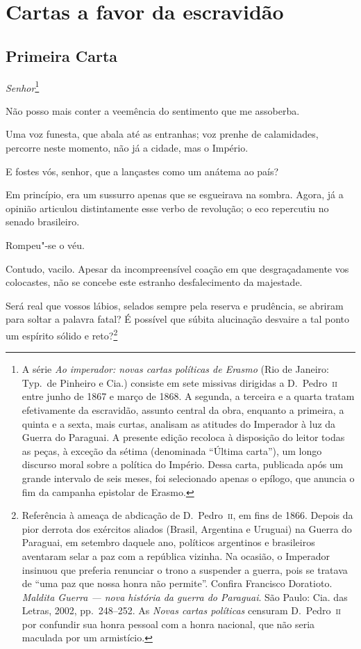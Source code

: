 \part{Cartas a favor da escravidão}

\chapter{Primeira Carta}

\noindent\textit{Senhor}\footnote{ A série \textit{Ao imperador: novas cartas políticas de Erasmo}
(Rio de Janeiro: Typ.~de Pinheiro e Cia.) consiste em sete missivas
dirigidas a D.~Pedro~\textsc{ii} entre junho de 1867 e março de 1868. A segunda,
a terceira e a quarta tratam efetivamente da escravidão, assunto
central da obra, enquanto a primeira, a quinta e a sexta, mais curtas,
analisam as atitudes do Imperador à luz da Guerra do Paraguai. A
presente edição recoloca à disposição do leitor todas as peças, à
exceção da sétima (denominada ``Última carta''), um longo discurso moral sobre a política
do Império. Dessa carta, publicada após um grande intervalo de seis
meses, foi selecionado apenas o epílogo, que anuncia o fim da
campanha epistolar de Erasmo.}\smallskip

Não posso mais conter a veemência do sentimento que me assoberba. 

Uma voz funesta, que abala até as entranhas; voz prenhe de calamidades,
percorre neste momento, não já a cidade, mas o Império. 

E fostes vós, senhor, que a lançastes como um anátema ao país? 

Em princípio, era um sussurro apenas que se esgueirava na sombra.
Agora, já a opinião articulou distintamente esse verbo de revolução; o
eco repercutiu no senado brasileiro. 

 Rompeu"-se o véu. 

 Contudo, vacilo. Apesar da incompreensível coação em que
desgraçadamente vos colocastes, não se concebe este estranho
desfalecimento da majestade. 

 Será real que vossos lábios, selados sempre pela reserva e prudência,
se abriram para soltar a palavra fatal? É possível que súbita
alucinação desvaire a tal ponto um espírito sólido e
reto?\footnote{ Referência à ameaça de abdicação de D.~Pedro~\textsc{ii}, em fins de 1866. Depois da pior
derrota dos exércitos aliados (Brasil, Argentina e Uruguai) na Guerra
do Paraguai, em setembro daquele ano, políticos argentinos e
brasileiros aventaram selar a paz com a república vizinha. Na ocasião,
o Imperador insinuou que preferia renunciar o trono a suspender a
guerra, pois se tratava de ``uma paz que nossa honra não permite''.
Confira Francisco Doratioto. \textit{Maldita Guerra --- nova história da
guerra do Paraguai}. São Paulo: Cia. das Letras, 2002, pp.~248--252.
As \textit{Novas cartas políticas} censuram D.~Pedro~\textsc{ii} por confundir
sua honra pessoal com a honra nacional, que não seria maculada por um armistício.}
 
